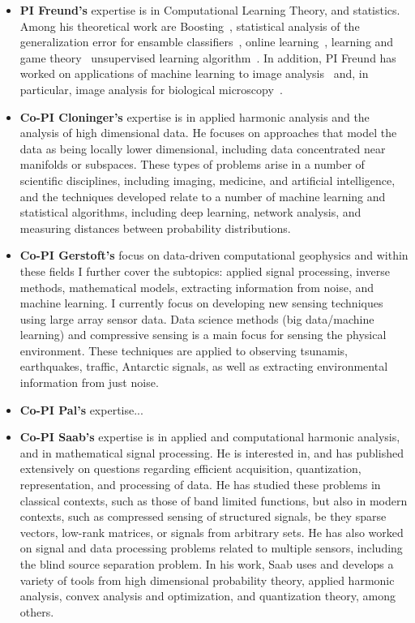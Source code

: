\documentclass{article}
\begin{document}
\begin{itemize}
\item {\bf PI Freund's} expertise is in Computational Learning Theory,
  and statistics. Among his theoretical work are Boosting~\cite{},
  statistical analysis of the generalization error for ensamble
  classifiers~\cite{}, online learning~\cite{}, learning and game
  theory~\cite{} unsupervised learning algorithm~\cite{}.  In
  addition, PI Freund has worked on applications of machine learning
  to image analysis~{} and, in particular, image analysis for
  biological microscopy~\cite{}.
\item {\bf Co-PI Cloninger's} expertise is in applied harmonic
  analysis and the analysis of high dimensional data.  He focuses on
  approaches that model the data as being locally lower dimensional,
  including data concentrated near manifolds or subspaces.  These
  types of problems arise in a number of scientific disciplines,
  including imaging, medicine, and artificial intelligence, and the
  techniques developed relate to a number of machine learning and
  statistical algorithms, including deep learning, network analysis,
  and measuring distances between probability distributions.

\item {\bf Co-PI Gerstoft's} focus on data-driven computational geophysics and within these fields I further cover the subtopics: applied signal processing, inverse methods, mathematical models, extracting information from noise, and machine learning. I currently focus on developing new sensing techniques using large array sensor data. Data science methods (big data/machine learning) and compressive sensing is a main focus for sensing the physical environment.  These techniques are applied to observing tsunamis, earthquakes, traffic, Antarctic signals, as well as extracting environmental information from just noise. 
\item {\bf Co-PI Pal's} expertise... 
\item {\bf Co-PI Saab's} expertise is in applied and computational harmonic analysis, and in mathematical signal processing. He is interested in, and has published extensively on questions regarding efficient acquisition, quantization, representation, and processing of data. He has studied these problems in classical contexts, such as those of band limited functions, but also in modern contexts, such as compressed sensing of structured signals, be they sparse vectors, low-rank matrices, or signals from arbitrary sets. He has also worked on signal and data processing problems related to multiple sensors, including the blind source separation problem. In his work, Saab uses and develops a variety of tools from high dimensional probability theory, applied harmonic analysis, convex analysis and optimization, and quantization theory, among others. 
\end{itemize}
\end{document}
